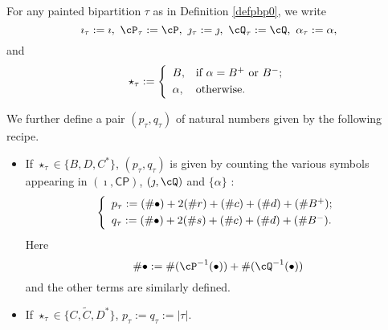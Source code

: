 \documentclass[12pt,a4paper]{amsart}
\def\abs#1{\left|{#1}\right|}
\newcommand{\CP}{{\mathcal {P}}}
\newcommand{\CQ}{{\mathcal {Q}}}
\numberwithin{equation}{section}
\theoremstyle{remark}
\newtheorem{remark}[thm]{Remark}
\def\CP{\mathsf{CP}}
\def\CQ{\overline{\sfA}}%
\begin{document}

For any painted bipartition $\tau$ as in Definition \ref{defpbp0}, we write
\[
  \imath_\tau:=\imath,\ \cP_\tau:=\cP,\ \jmath_\tau:=\jmath,\ \cQ_\tau:=\cQ,\ \alpha_\tau:=\alpha,
\]
and
\[
  \star_\tau:= \left\{
    \begin{array}{ll}
      B, &\hbox{if $\alpha=B^+$ or $B^-$}; \smallskip\\
      \alpha, & \hbox{otherwise}.           \end{array}
  \right.
\]

We further define a pair $(p_{\tau}, q_{\tau})$ of natural numbers given by the
following recipe.
\begin{itemize}
  \item If $\star_\tau\in \{B, D, C^*\}$, $(p_\tau, q_\tau)$ is given by
        counting the various symbols appearing in $(\imath, \CP)$,
        $(\jmath, \cQ)$ and $\{\alpha\}$ :
        \begin{equation}\label{ptqt}
          \left\{
            \begin{array}{l}
              p_\tau :=( \# \bullet)+ 2 (\# r) +(\# c )+ (\# d) + (\# B^+);\smallskip\\
              q_\tau :=( \# \bullet)+ 2 (\# s) + (\# c) + (\# d) + (\# B^-).\\
            \end{array}
          \right.
        \end{equation}
        Here
        \[
        \#\bullet:=\#(\cP^{-1}(\bullet))+\#(\cQ^{-1}(\bullet))
        \]
        and the other terms are similarly defined.
  \item If $\star_\tau\in \{C, \widetilde C, D^*\}$,
        $p_\tau:=q_\tau:=\abs{\tau}$.
\end{itemize}
\smallskip
\end{document}
